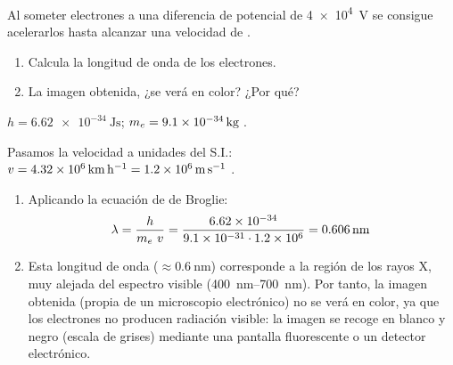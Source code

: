 \begin{exercise}
    Al someter electrones a una diferencia de potencial de \SI{4e4}{\volt} se consigue acelerarlos hasta alcanzar una velocidad de .


    \begin{enumerate}[label=\letraminuscula]
        \item Calcula la longitud de onda de los electrones.
        \item La imagen obtenida, ¿se verá en color? ¿Por qué?
    \end{enumerate}
    \datos{} \(h = \SI{6.62e-34}{\joule\s}\); \(m_e = \masa[kg]{9.1e-34}\).

    \begin{solu}
        Pasamos la velocidad a unidades del S.I.: \(v = \SI{4.32e6}{\kilo\meter\per\hour} = \velocidad[ms]{1.2e6}\).
        \begin{enumerate}[label=\letraminuscula]
            \item Aplicando la ecuación de de Broglie:
            \begin{equation*}
                \lambda = \dfrac{h}{m_e\ v} = \dfrac{\num{6.62e-34}}{\num{9.1e-31}\cdot \num{1.2e6}} = \distancia[nm]{0.606}
            \end{equation*}
            \item Esta longitud de onda (\(\approx \SI{0.6}{\nano\meter}\)) corresponde a la región de los rayos X, muy alejada del espectro visible (\SIrange{400}{700}{\nano\meter}). Por tanto, la imagen obtenida (propia de un microscopio electrónico) no se verá en color, ya que los electrones no producen radiación visible: la imagen se recoge en blanco y negro (escala de grises) mediante una pantalla fluorescente o un detector electrónico.
        \end{enumerate}
    \end{solu}
\end{exercise}

